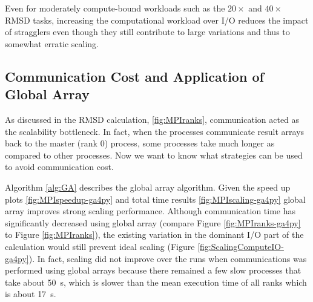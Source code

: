 Even for moderately compute-bound workloads such
as the $20\times$ and $40\times$ RMSD tasks, increasing the computational workload over I/O reduces the impact of stragglers even
though they still contribute to large variations and thus to somewhat erratic scaling.


\subsection{Communication Cost and Application of Global Array}
\label{Global-Array}
As discussed in the RMSD calculation, \ref{fig:MPIranks}, communication acted as the scalability bottleneck. 
In fact, when the processes communicate result arrays back to the master (rank 0) process, some processes take much longer as compared to other processes. 
Now we want to know what strategies can be used to avoid communication cost. 

Algorithm \ref{alg:GA} describes the global array algorithm. 
Given the speed up plots \ref{fig:MPIspeedup-ga4py} and total time results \ref{fig:MPIscaling-ga4py} global array improves strong scaling performance.
Although communication time has significantly decreased using global array (compare Figure \ref{fig:MPIranks-ga4py} to Figure \ref{fig:MPIranks}),
the existing variation in the dominant I/O part of the calculation would still prevent ideal scaling (Figure \ref{fig:ScalingComputeIO-ga4py}).
In fact, scaling did not improve over the runs when communications was performed using global arrays because there remained a few slow processes
that take about 50~s, which is slower than the mean execution time of all ranks which is about 17~s. 

